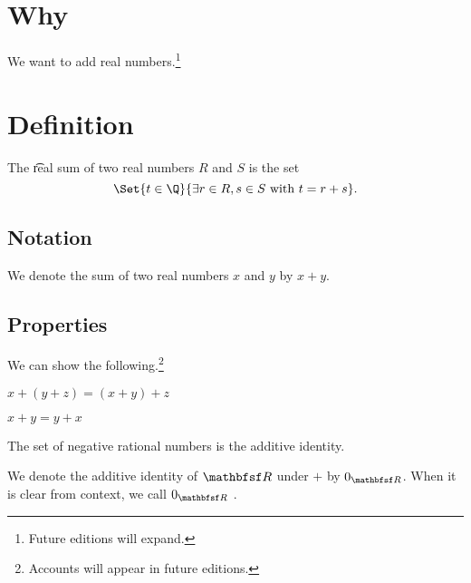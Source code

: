 

\section*{Why}

We want to add real numbers.\footnote{Future editions will expand.}

\section*{Definition}

The \t{real sum} of two real numbers $R$ and $S$ is the set
    \[
\Set{t \in \Q }{\exists r \in R, s \in S \text{ with } t = r + s}.
    \]

\subsection*{Notation}

We denote the sum of two real numbers $x$ and $y$ by $x + y$.

\subsection*{Properties}

We can show the following.\footnote{Accounts will appear in future editions.}

\begin{proposition}[Associative]
$x + (y + z) = (x + y) + z$
\end{proposition}
\begin{proposition}[Commutative]
$x + y = y + x$\end{proposition}
\begin{proposition}[Identity]
The set of negative rational numbers is the additive identity.\end{proposition}
We denote the additive identity of $\R $ under $+$ by $0_{\R }$.
When it is clear from context, we call $0_{\R }$ .

\blankpage